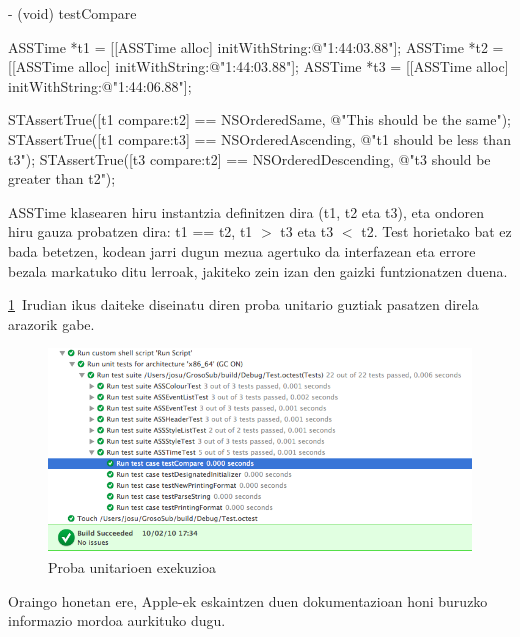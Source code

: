 \begin{verbatimtab}[8]
- (void) testCompare
{
	ASSTime *t1 = [[ASSTime alloc]
			initWithString:@"1:44:03.88"];
	ASSTime *t2 = [[ASSTime alloc]
			initWithString:@"1:44:03.88"];
	ASSTime *t3 = [[ASSTime alloc]
			initWithString:@"1:44:06.88"];
	
	STAssertTrue([t1 compare:t2] == NSOrderedSame,
			@"This should be the same");
	STAssertTrue([t1 compare:t3] == NSOrderedAscending,
			@"t1 should be less than t3");
	STAssertTrue([t3 compare:t2] == NSOrderedDescending,
			@"t3 should be greater than t2");
}
\end{verbatimtab}

ASSTime klasearen hiru instantzia definitzen dira (t1, t2 eta t3), eta ondoren hiru gauza probatzen dira: t1 == t2, t1 $>$ t3 eta t3 $<$ t2. Test horietako bat ez bada betetzen, kodean jarri dugun mezua agertuko da interfazean eta errore bezala markatuko ditu lerroak, jakiteko zein izan den gaizki funtzionatzen duena.

\ref{ocunit}~Irudian ikus daiteke diseinatu diren proba unitario guztiak pasatzen direla arazorik gabe.
\begin{figure}[htp]
\begin{center}
\includegraphics[scale=0.6]{Pictures/Chapter4/Probak/ocunit.png}
\caption{Proba unitarioen exekuzioa}
\label{ocunit}
\end{center}
\end{figure}

Oraingo honetan ere, Apple-ek eskaintzen duen dokumentazioan\cite{ap:ocu} honi buruzko informazio mordoa aurkituko dugu.

